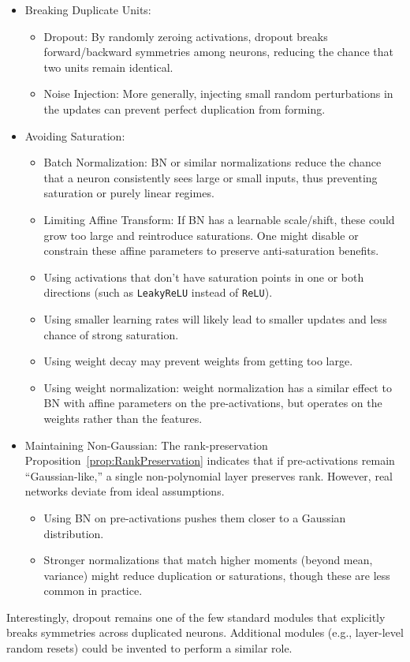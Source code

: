 \documentclass[11pt]{article}
\begin{document}
\begin{itemize}
    \item Breaking Duplicate Units:
    \begin{itemize}
        \item Dropout: By randomly zeroing activations, dropout breaks forward/backward symmetries among neurons, reducing the chance that two units remain identical.
        \item Noise Injection: More generally, injecting small random perturbations in the updates can prevent perfect duplication from forming.
    \end{itemize}
    \item Avoiding Saturation:
    \begin{itemize}
        \item Batch Normalization: BN or similar normalizations reduce the chance that a neuron consistently sees large or small inputs, thus preventing saturation or purely linear regimes.
        \item Limiting Affine Transform: If BN has a learnable scale/shift, these could grow too large and reintroduce saturations. One might disable or constrain these affine parameters to preserve anti-saturation benefits.
        \item Using activations that don't have saturation points in one or both directions (such as \texttt{LeakyReLU} instead of \texttt{ReLU}).
        \item Using smaller learning rates will likely lead to smaller updates and less chance of strong saturation.
        \item Using weight decay may prevent weights from getting too large. 
        \item Using weight normalization: weight normalization has a similar effect to BN with affine parameters on the pre-activations, but operates on the weights rather than the features. 
    \end{itemize}
    \item Maintaining Non-Gaussian:  
    The rank-preservation Proposition~\ref{prop:RankPreservation} indicates that if pre-activations remain ``Gaussian-like,'' a single non-polynomial layer preserves rank. However, real networks deviate from ideal assumptions.
    \begin{itemize}
        \item Using BN on pre-activations pushes them closer to a Gaussian distribution.
        \item Stronger normalizations that match higher moments (beyond mean, variance) might reduce duplication or saturations, though these are less common in practice.
    \end{itemize}
\end{itemize}
Interestingly, dropout remains one of the few standard modules that explicitly breaks symmetries across duplicated neurons. Additional modules (e.g., layer-level random resets) could be invented to perform a similar role.
\end{document}
